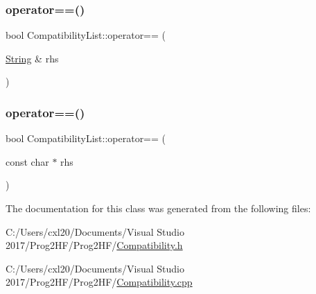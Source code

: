 \mbox{\label{class_compatibility_list_a3836f2aaefc1753287dd4d6052e17469}} 
\subsubsection{\texorpdfstring{operator==()}{operator==()}\hspace{0.1cm}{\footnotesize\ttfamily [1/2]}}
{\footnotesize\ttfamily bool Compatibility\+List\+::operator== (\begin{DoxyParamCaption}\item[{\mbox{\hyperlink{class_string}{String}} \&}]{rhs }\end{DoxyParamCaption})\hspace{0.3cm}{\ttfamily [inline]}}

\mbox{\label{class_compatibility_list_ad476ceb7026c6316112d5f11b283357e}} 
\subsubsection{\texorpdfstring{operator==()}{operator==()}\hspace{0.1cm}{\footnotesize\ttfamily [2/2]}}
{\footnotesize\ttfamily bool Compatibility\+List\+::operator== (\begin{DoxyParamCaption}\item[{const char $\ast$}]{rhs }\end{DoxyParamCaption})\hspace{0.3cm}{\ttfamily [inline]}}



The documentation for this class was generated from the following files\+:\begin{DoxyCompactItemize}
\item 
C\+:/\+Users/cxl20/\+Documents/\+Visual Studio 2017/\+Prog2\+H\+F/\+Prog2\+H\+F/\mbox{\hyperlink{_compatibility_8h}{Compatibility.\+h}}\item 
C\+:/\+Users/cxl20/\+Documents/\+Visual Studio 2017/\+Prog2\+H\+F/\+Prog2\+H\+F/\mbox{\hyperlink{_compatibility_8cpp}{Compatibility.\+cpp}}\end{DoxyCompactItemize}
